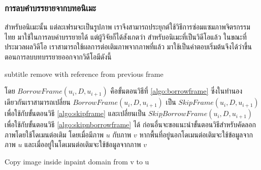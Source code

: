 \documentclass[hidelinks, a4paper,12pt]{article}
\numberwithin{equation}{section}							%
\numberwithin{equation}{section}
\begin{document}
{	\subsubsection{การลบคำบรรยายจากบทอนิเมะ}
	\hspace{1cm} สำหรับอนิเมะนั้น แต่ละเฟรมจะเป็นรูปภาพ เราจึงสามารถประยุกต์ใช้วิธีการซ่อมแซมภาพจิตรกรรมไทย มาใช้ในการลบคำบรรยายได้ แต่ผู้วิจัยก็ได้สังเกตว่า สำหรับอนิเมะที่เป็นวิดีโอแล้ว ในขณะที่ประมวลผลวิดีโอ เราสามารถใช้ผลการต่อเติมภาพจากภาพที่แล้ว มาใช้เป็นคำตอบเริ่มต้นจึงได้ว่าขึ้นตอนการลบบทบรรยายออกจากวิดีโอมีดังนี้\\
	\begin{algorithm}[H]
		\caption{subtitle remove with reference from previous frame}
	\end{algorithm}
	\hspace{1cm} โดย $BorrowFrame(u_{i},D,u_{i+1})$  คือขั้นตอนวิธีที่ \ref{algo:borrowframe} ซึ่งในทำนองเดียวกันเราสามารถเปลี่ยน $BorrowFrame(u_{i},D,u_{i+1})$ เป็น $SkipFrame(u_{i},D,u_{i+1})$ เพื่อใช้กับขั้นตอนวิธี \ref{algo:skipframe} และเปลี่ยนเป็น  $SkipฺBorrowFrame(u_{i},D,u_{i+1})$ เพื่อใช้กับขั้นตอนวิธี \ref{algo:skipnborrowframe} ได้
	ก่อนอื่นจะขอแนะนำขั้นตอนวิธีสำหรับคัดลอกภาพโดยใช้โดเมนต่อเติม โดยเมื่อมีภาพ $u$ กับภาพ $v$ หากพื้นที่อยู่นอกโดเมนต่อเติมจะใช้ข้อมูลจากภาพ $u$ และเมื่ออยู่ในโดเมนต่อเติมจะใช้ข้อมูลจากภาพ $v$
	\begin{algorithm}[H]
		\caption{Copy image inside inpaint domain from v to u}

\end{algorithm}}
\end{document}
